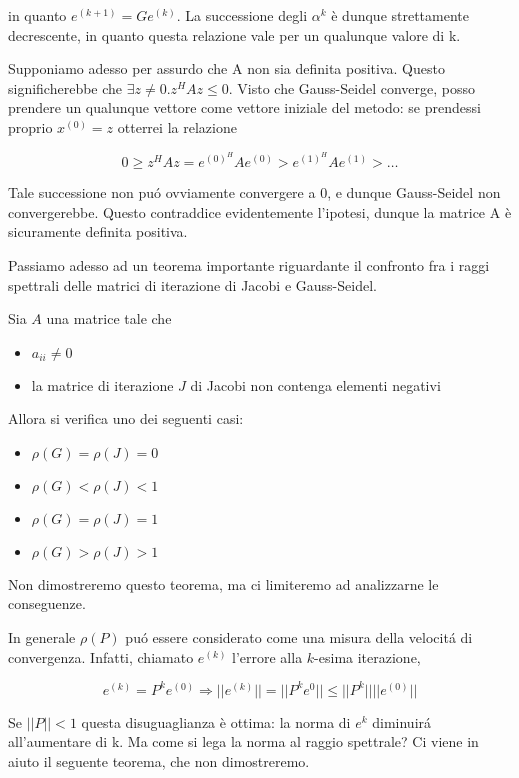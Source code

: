\begin{thproof}
\begin{description}
in quanto $ e^{(k+1)} = G e^{(k)} $. La successione degli $ \alpha^{k} $ \`e dunque strettamente decrescente, in quanto questa relazione vale per un qualunque valore di k.

Supponiamo adesso per assurdo che A non sia definita positiva. Questo significherebbe che $ \exists z \neq 0.z^HAz \leq 0 $. Visto che Gauss-Seidel converge, posso prendere un qualunque vettore come vettore iniziale del metodo: se prendessi proprio $ x^{(0)} = z $ otterrei la relazione

\[ 0 \geq z^HAz = e^{(0)^{H}} A e^{(0)} > e^{(1)^{H}} A e^{(1)} > \ldots \]

Tale successione non pu\'o ovviamente convergere a 0, e dunque Gauss-Seidel non convergerebbe. Questo contraddice evidentemente l'ipotesi, dunque la matrice A \`e sicuramente definita positiva.
\end{description}
\end{thproof}


Passiamo adesso ad un teorema importante riguardante il confronto fra i raggi spettrali delle matrici di iterazione di Jacobi e Gauss-Seidel.

\begin{theo}
Sia $A$ una matrice tale che 
\begin{itemize}
\item $a_{ii} \neq 0 $
\item la matrice di iterazione $J$ di Jacobi non contenga elementi negativi
\end{itemize}
Allora si verifica uno dei seguenti casi:
\begin{itemize}
 \item $\rho(G) = \rho(J) = 0$
 \item $\rho(G) < \rho(J) < 1$
 \item $\rho(G) = \rho(J) = 1$
 \item $\rho(G) > \rho(J) > 1$
\end{itemize}
\end{theo}

Non dimostreremo questo teorema, ma ci limiteremo ad analizzarne le conseguenze.

In generale $\rho(P)$ pu\'o essere considerato come una misura della velocit\'a di convergenza. Infatti, chiamato $e^{(k)}$ l'errore alla $k$-esima iterazione, 

$$ e^{(k)} = P^{k} e^{(0)} \Rightarrow || e^{(k)} || = || P^k e^0 || \leq || P^{k} || ||e^{(0)}|| $$

Se $ ||P|| < 1 $ questa disuguaglianza \`e ottima: la norma di $ e^k $ diminuir\'a all'aumentare di k. Ma come si lega la norma al raggio spettrale? Ci viene in aiuto il seguente teorema, che non dimostreremo.

